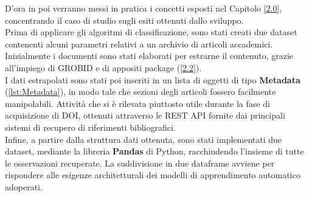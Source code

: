 D'ora in poi verranno messi in pratica i concetti esposti nel Capitolo \ref{2.0}, concentrando il caso di studio sugli esiti ottenuti dallo sviluppo. \vspace{7pt} \\
Prima di applicare gli algoritmi di classificazione, sono stati creati due dataset contenenti alcuni parametri relativi a un archivio di articoli accademici. Inizialmente i documenti sono stati elaborati per estrarne il contenuto, grazie all'impiego di GROBID e di appositi package (\ref{2.2}). \vspace{7pt} \\
I dati estrapolati sono stati poi inseriti in un lista di oggetti di tipo \textbf{Metadata} (\ref{lst:Metadata}), in modo tale che sezioni degli articoli fossero facilmente manipolabili. Attività che si è rilevata piuttosto utile durante la fase di acquisizione di DOI, ottenuti attraverso le REST API fornite dai principali sistemi di recupero di riferimenti bibliografici. \vspace{7pt} \\
Infine, a partire dalla struttura dati ottenuta, sono stati implementati due dataset, mediante la libreria \textbf{Pandas} di Python, racchiudendo l'insieme di tutte le osservazioni recuperate. La suddivisione in due dataframe avviene per rispondere alle esigenze architetturali dei modelli di apprendimento automatico adoperati.